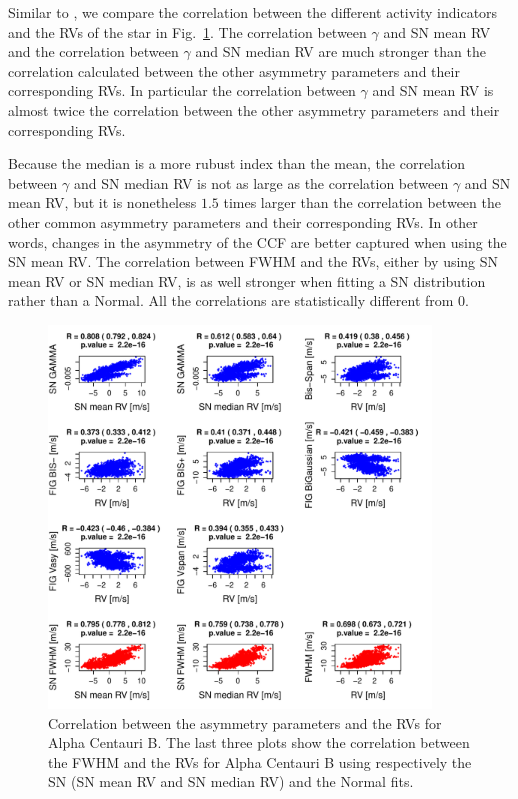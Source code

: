 \documentclass[11pt, oneside]{article}
\begin{document}
Similar to \citet{Figueira-2013}, we compare the correlation between the different activity indicators and the RVs of the star in Fig.~\ref{fig:alphacent:corrPlot}. The correlation between $\gamma$ and SN mean RV and the correlation between $\gamma$ and SN median RV are much stronger than the correlation calculated between the other asymmetry parameters and their corresponding RVs. In particular the correlation between $\gamma$ and SN mean RV is almost twice the correlation between the other asymmetry parameters and their corresponding RVs.

Because the median is a more rubust index than the mean, the correlation between $\gamma$ and SN median RV is not as large as the correlation between $\gamma$ and SN mean RV, but it is nonetheless $1.5$ times larger than the correlation between the other common asymmetry parameters and their corresponding RVs. In other words, changes in the asymmetry of the CCF are better captured when using the SN mean RV. The correlation between FWHM and the RVs, either by using SN mean RV or SN median RV, is as well stronger when fitting a SN distribution rather than a Normal. All the correlations are statistically different from $0$.
%
\begin{figure}[htbp]
   \centering
\includegraphics[height = 4in]{HD12862_[4]Comparison_para.pdf}  
   \caption{Correlation between the asymmetry parameters and the RVs for Alpha Centauri B. The last three plots show the correlation between the FWHM and the RVs for Alpha Centauri B using respectively the SN (SN mean RV and SN median RV) and the Normal fits.}
   \label{fig:alphacent:corrPlot}
\end{figure}
%
\end{document}
